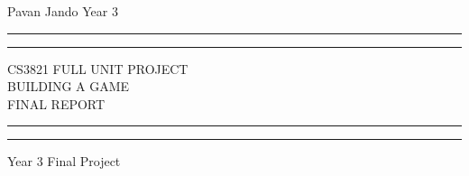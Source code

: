 \documentclass[a4paper]{report}
\begin{document}
 
\titleformat{\chapter}{\huge\normalfont\bfseries}{\thechapter}{1em}{\huge}
\begin{titlepage} %

Pavan Jando Year 3

\centering %

\scshape %

\vspace*{\baselineskip} %


\rule{\textwidth}{1.6pt}\vspace*{-\baselineskip}\vspace*{2pt} %
\rule{\textwidth}{0.4pt} %

\vspace{0.75\baselineskip} %

{\LARGE CS3821 FULL UNIT PROJECT\\BUILDING A GAME\\FINAL REPORT\\} %

\vspace{0.75\baselineskip} %

\rule{\textwidth}{0.4pt}\vspace*{-\baselineskip}\vspace{3.2pt} %
\rule{\textwidth}{1.6pt} %

\vspace{2\baselineskip} %


Year 3 Final Project %

\vspace*{3\baselineskip} %



\end{titlepage}
\end{document}
